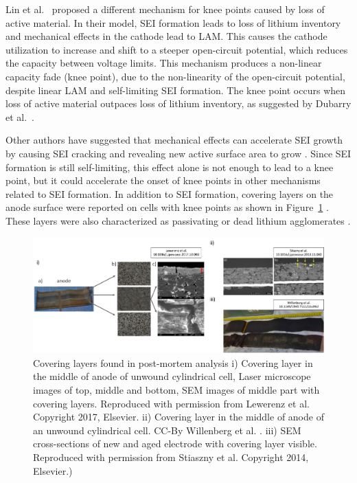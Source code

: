 \documentclass{article}
\begin{document}
Lin et al.~\cite{lin_comprehensive_2013} proposed a different mechanism for knee points caused by loss of active material. In their model, SEI formation leads to loss of lithium inventory and mechanical effects in the cathode lead to LAM. This causes the cathode utilization to increase and shift to a steeper open-circuit potential, which reduces the capacity between voltage limits. This mechanism produces a non-linear capacity fade (knee point), due to the non-linearity of the open-circuit potential, despite linear LAM and self-limiting SEI formation. The knee point occurs when loss of active material outpaces loss of lithium inventory, as suggested by Dubarry et al.~\cite{dubarry_durability_2018}.

Other authors have suggested that mechanical effects can accelerate SEI growth by causing SEI cracking and revealing new active surface area to grow \cite{kupper_end--life_2018,louli_operando_2019}. Since SEI formation is still self-limiting, this effect alone is not enough to lead to a knee point, but it could accelerate the onset of knee points in other mechanisms related to SEI formation.
In addition to SEI formation, covering layers on the anode surface were reported on cells with knee points as shown in Figure~\ref{fig:covering_layers} \cite{lewerenz_post-mortem_2017,willenberg_development_2020,stiaszny_electrochemical_2014}. These layers were also characterized as passivating or dead lithium agglomerates \cite{schindler_fast_2018}.

\begin{figure}[ht]
\centering
\includegraphics[scale = 0.5]{figures/CoveringLayers.pdf}
\caption{Covering layers found in post-mortem analysis i) Covering layer in the middle of anode of unwound cylindrical cell, Laser microscope images of top, middle and bottom, SEM images of middle part with covering layers.   Reproduced with permission from Lewerenz et al. \cite{lewerenz_post-mortem_2017} Copyright 2017, Elsevier. ii) Covering layer in the middle of anode of an unwound cylindrical cell. CC-By Willenberg et al. \cite{willenberg_development_2020}. iii) SEM cross-sections of new and aged electrode with covering layer visible. Reproduced with permission from Stiaszny et al. \cite{stiaszny_electrochemical_2014} Copyright 2014, Elsevier.)}
\label{fig:covering_layers}
\end{figure}
\end{document}
